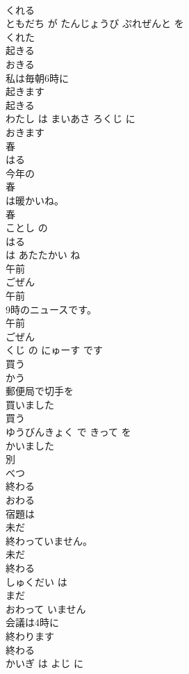 \documentclass[8pt]{extreport}
\begin{document}
\begin{CJK}{UTF8}{min}
\\	くれる 
\\	ともだち が たんじょうび ぷれぜんと を 
\\	くれた
\\	起きる	
\\	おきる	
\\	私は毎朝6時に
\\	起きます
\\	起きる 
\\	わたし は まいあさ ろくじ に 
\\	おきます
\\	春	
\\	はる	
\\	今年の
\\	春
\\	は暖かいね。	
\\	春 
\\	ことし の 
\\	はる
\\	は あたたかい ね	
\\	午前	
\\	ごぜん	
\\	午前
\\	9時のニュースです。	
\\	午前 
\\	ごぜん
\\	くじ の にゅーす です	
\\	買う	
\\	かう	
\\	郵便局で切手を
\\	買いました
\\	買う 
\\	ゆうびんきょく で きって を 
\\	かいました
\\	別	
\\	べつ	
\\	終わる	
\\	おわる	
\\	宿題は
\\	未だ
\\	終わっていません。	
\\	未だ 
\\	終わる 
\\	しゅくだい は 
\\	まだ
\\	おわって いません	
\\	会議は4時に
\\	終わります
\\	終わる 
\\	かいぎ は よじ に 

\end{CJK}
\end{document}
